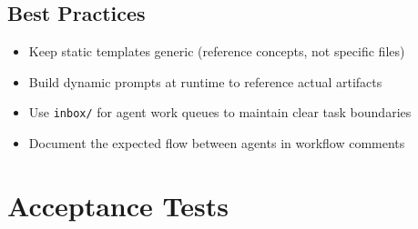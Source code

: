 \documentclass[11pt,a4paper]{article}
\begin{document}
\subsection{Best Practices}

\begin{itemize}
    \item Keep static templates generic (reference concepts, not specific files)
    \item Build dynamic prompts at runtime to reference actual artifacts
    \item Use \texttt{inbox/} for agent work queues to maintain clear task boundaries
    \item Document the expected flow between agents in workflow comments
\end{itemize}

\section{Acceptance Tests}
\end{document}
